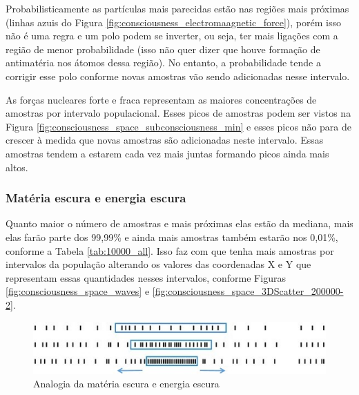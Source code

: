 Probabilisticamente as partículas mais parecidas estão nas regiões mais próximas (linhas azuis do Figura \ref{fig:consciousness_electromaagnetic_force}), porém isso não é uma regra e um polo podem se inverter, ou seja, ter mais ligações com a região de menor probabilidade (isso não quer dizer que houve formação de antimatéria nos átomos dessa região). No entanto, a probabilidade tende a corrigir esse polo conforme novas amostras vão sendo adicionadas nesse intervalo. 

As forças nucleares forte e fraca representam as maiores concentrações de amostras por intervalo populacional. Esses picos de amostras podem ser vistos na Figura \ref{fig:consciousness_space_subconsciousness_min} e esses picos não para de crescer à medida que novas amostras são adicionadas neste intervalo. Essas amostras tendem a estarem cada vez mais juntas formando picos ainda mais altos.

\subsubsection{Matéria escura e energia escura}
Quanto maior o número de amostras e mais próximas elas estão da mediana, mais elas farão parte dos 99,99\% e ainda mais amostras também estarão nos 0,01\%, conforme a Tabela \ref{tab:10000_all}. Isso faz com que tenha mais amostras por intervalos da população alterando os valores das coordenadas X e Y que representam essas quantidades nesses intervalos, conforme Figuras \ref{fig:consciousness_space_waves} e \ref{fig:consciousness_space_3DScatter_200000-2}.
\begin{figure}[H]
\caption{Analogia da matéria escura e energia escura}
\label{fig:consciousness_dark_matter_dark_energy}
\centering
\includegraphics[scale=1]{sections/images/consciousness_dark_matter_dark_energy.jpg}
\end{figure}

